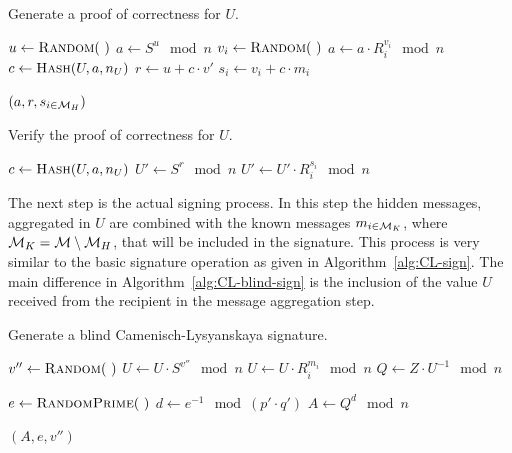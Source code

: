 \begin{algorithm}
  \caption{Generate a proof of correctness for $U$.}
  \label{alg:CL-proof-U}
  \addtolength{\baselineskip}{1mm}
  \begin{algorithmic}[1]
      \State $u \gets \Call{Random}{~}$
      \State $a \gets S^u \mod n$
        \State $v_i \gets \Call{Random}{~}$
        \State $a \gets a \cdot R_i^{v_i} \mod n$
      \EndFor
      \State $c \gets \Call{Hash}{U, a, n_U}$
      \State $r \gets u + c \cdot v'$
        \State $s_i \gets v_i + c \cdot m_i$
      \EndFor

      \Return $(a, r, s_{i \in \mathcal{M}_H})$
    \EndFunction
  \end{algorithmic}
\end{algorithm}

\begin{algorithm}
  \caption{Verify the proof of correctness for $U$.}
  \label{alg:CL-verify-U}
  \addtolength{\baselineskip}{1mm}
  \begin{algorithmic}[1]

      \State $c \gets \Call{Hash}{U, a, n_U}$
      \State $U' \gets S^r \mod n$
        \State $U' \gets U' \cdot R_i^{s_i} \mod n$
      \EndFor
        \Return {}
      \EndIf

      \Return {}
    \EndFunction
  \end{algorithmic}
\end{algorithm}

The next step is the actual signing process. In this step the hidden messages,
aggregated in $U$ are combined with the known messages $m_{i \in \mathcal{M}_K}$, where
$\mathcal{M}_K = \mathcal{M} \setminus \mathcal{M}_H$, that will be included in the signature. This
process is very similar to the basic signature operation as given in
Algorithm~\ref{alg:CL-sign}. The main difference in
Algorithm~\ref{alg:CL-blind-sign} is the inclusion of the value $U$ received
from the recipient in the message aggregation step.

\begin{algorithm}
  \caption{Generate a blind Camenisch-Lysyanskaya signature.}
  \label{alg:CL-blind-sign}
  \addtolength{\baselineskip}{1mm}
  \begin{algorithmic}[1]

      \State $v'' \gets \Call{Random}{~}$
      \State $U \gets U \cdot S^{v''} \mod n$
        \State $U \gets U \cdot R_i^{m_i} \mod n$
      \EndFor
      \State $Q \gets Z \cdot U^{-1} \mod n$

      \State $e \gets \Call{RandomPrime}{~}$
      \State $d \gets e^{-1} \mod (p' \cdot q')$
      \State $A \gets Q^d \mod n$

      \Return $(A, e, v'')$
    \EndFunction
  \end{algorithmic}
\end{algorithm}

